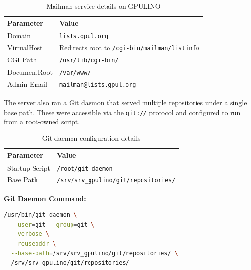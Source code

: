 \begin{table}[H]
  \centering
  \caption{Mailman service details on GPULINO}
  \label{tab:gpulino_mailman}
  \begin{tabular}{ll}
    \rowcolor{udcpink!25}
    \textbf{Parameter} & \textbf{Value} \\
    \hline
    Domain & \texttt{lists.gpul.org} \\
    VirtualHost & Redirects root to \texttt{/cgi-bin/mailman/listinfo} \\
    CGI Path & \texttt{/usr/lib/cgi-bin/} \\
    DocumentRoot & \texttt{/var/www/} \\
    Admin Email & \texttt{mailman@lists.gpul.org} \\
  \end{tabular}
\end{table}

The server also ran a Git daemon that served multiple repositories under a single base path. These were accessible via the \texttt{git://} protocol and configured to run from a root-owned script.

\begin{table}[H]
  \centering
  \caption{Git daemon configuration details}
  \label{tab:gpulino_git_daemon}
  \begin{tabular}{ll}
    \rowcolor{udcpink!25}
    \textbf{Parameter} & \textbf{Value} \\
    \hline
    Startup Script & \texttt{/root/git-daemon} \\
    Base Path & \verb|/srv/srv_gpulino/git/repositories/| \\
  \end{tabular}
\end{table}

\noindent
\textbf{Git Daemon Command:}

\begin{lstlisting}[language=sh]
/usr/bin/git-daemon \
  --user=git --group=git \
  --verbose \
  --reuseaddr \
  --base-path=/srv/srv_gpulino/git/repositories/ \
  /srv/srv_gpulino/git/repositories/
\end{lstlisting}

